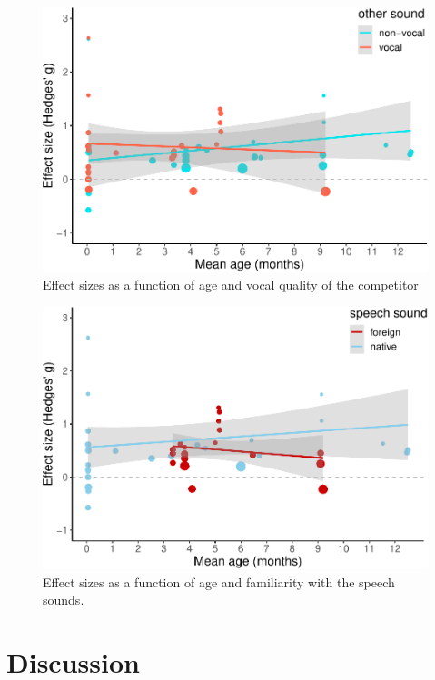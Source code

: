 \documentclass[man]{apa6}
\begin{document}
\begin{figure}
\centering
\includegraphics{MA_speech_pref_files/figure-latex/vocal-1.pdf}
\caption{\label{fig:vocal}Effect sizes as a function of age and vocal
quality of the competitor}
\end{figure}

\begin{figure}
\centering
\includegraphics{MA_speech_pref_files/figure-latex/unnamed-chunk-4-1.pdf}
\caption{\label{fig:unnamed-chunk-4}Effect sizes as a function of age and
familiarity with the speech sounds.}
\end{figure}

\section{Discussion}\label{discussion}
\end{document}
